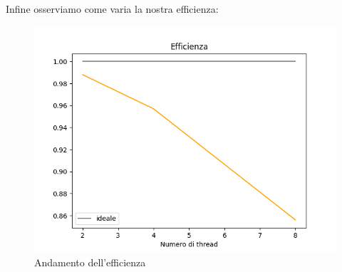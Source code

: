 \clearpage

Infine osserviamo come varia la nostra efficienza:
\begin{figure}[h!tbp]
    \centering
    \includegraphics[width=1\linewidth]{efficienza.png}
    \caption{Andamento dell'efficienza}
    \label{fig:enter-label}
\end{figure}
